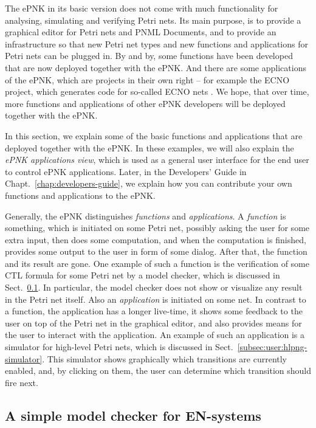 The ePNK in its basic version does not come with much functionality for
analysing, simulating and verifying Petri nets. Its main purpose, is
to provide a graphical editor for Petri nets and PNML Documents, and
to provide an infrastructure so that new Petri net types and new functions
and applications for Petri nets can be plugged in. By and by, some functions
have been developed that are now deployed together with the ePNK. And there
are some applications of the ePNK, which are projects in their own right -- for
example the ECNO project, which generates code for so-called ECNO nets
\cite{Kin12b}. We hope, that over time, more functions and applications
of other ePNK developers will be deployed together with the ePNK.

In this section, we explain some of the basic functions and applications
that are deployed together with the ePNK. In these examples, we will
also explain the \emph{ePNK applications view},%
which is used as a
general user interface for the end user to control ePNK applications. 
Later, in the Developers' Guide in Chapt.~\ref{chap:developers-guide}, we
explain how you can contribute your own functions and applications to the ePNK.

Generally, the ePNK distinguishes \emph{functions} and \emph{applications}.
A \emph{function}
is something, which is initiated on some Petri net, possibly asking the user for
some extra input, then does some computation, and when the computation is
finished, provides some output to the user in form of some dialog. After that,
the function and its result are gone. One example of such a function is the
verification of some CTL formula for some Petri net by a model checker, which
is discussed in Sect.~\ref{subsec:user:model-checker}. In particular, the
model checker does not show or visualize any result in the Petri net itself.
Also an \emph{application}
is initiated on some net. In contrast to a function, the application
has a longer live-time, it shows some feedback to the user on top of the
Petri net in the graphical editor, and also provides means for the user
to interact with the application. An example of such an application is a 
simulator for high-level Petri nets, which is discussed in
Sect.~\ref{subsec:user:hlpng-simulator}. This simulator shows
graphically which transitions are currently enabled, and, by clicking
on them, the user can determine which transition should fire next.%

\subsection{A simple model checker for EN-systems}
\label{subsec:user:model-checker}


